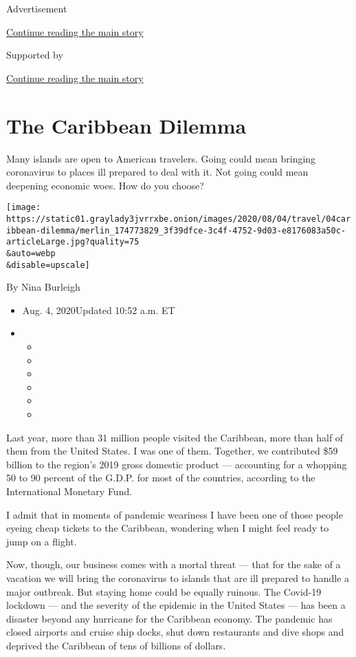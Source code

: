 Advertisement

\protect\hyperlink{after-top}{Continue reading the main story}

Supported by

\protect\hyperlink{after-sponsor}{Continue reading the main story}

\hypertarget{the-caribbean-dilemma}{%
\section{The Caribbean Dilemma}\label{the-caribbean-dilemma}}

Many islands are open to American travelers. Going could mean bringing
coronavirus to places ill prepared to deal with it. Not going could mean
deepening economic woes. How do you choose?

\texttt{[image: https://static01.graylady3jvrrxbe.onion/images/2020/08/04/travel/04caribbean-dilemma/merlin\_174773829\_3f39dfce-3c4f-4752-9d03-e8176083a50c-articleLarge.jpg?quality=75\\\&auto=webp\\\&disable=upscale]}

By Nina Burleigh

\begin{itemize}
\item
  Aug. 4, 2020Updated 10:52 a.m. ET
\item
  \begin{itemize}
  \item
  \item
  \item
  \item
  \item
  \item
  \end{itemize}
\end{itemize}

Last year, more than 31 million people visited the Caribbean, more than
half of them from the United States. I was one of them. Together, we
contributed \$59 billion to the region's 2019 gross domestic product ---
accounting for a whopping 50 to 90 percent of the G.D.P. for most of the
countries, according to the International Monetary Fund.

I admit that in moments of pandemic weariness I have been one of those
people eyeing cheap tickets to the Caribbean, wondering when I might
feel ready to jump on a flight.

Now, though, our business comes with a mortal threat --- that for the
sake of a vacation we will bring the coronavirus to islands that are ill
prepared to handle a major outbreak. But staying home could be equally
ruinous. The Covid-19 lockdown --- and the severity of the epidemic in
the United States --- has been a disaster beyond any hurricane for the
Caribbean economy. The pandemic has closed airports and cruise ship
docks, shut down restaurants and dive shops and deprived the Caribbean
of tens of billions of dollars.

